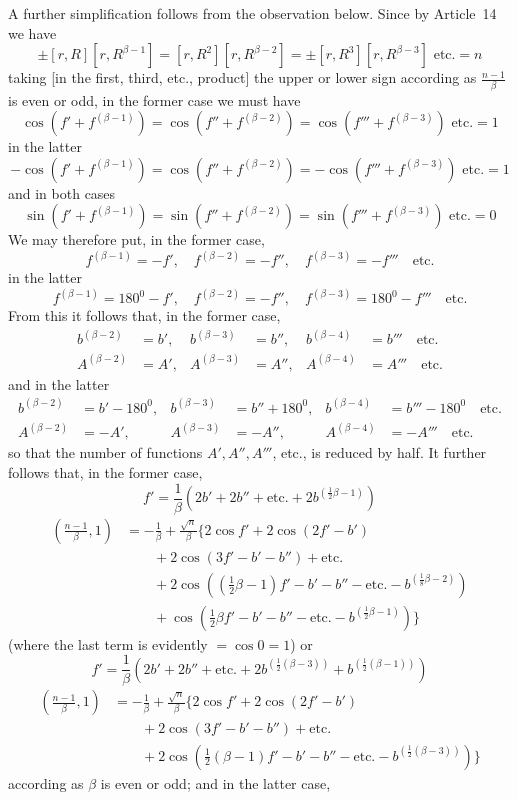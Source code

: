 \clearpage
{}
A further simplification follows from the observation below. Since by Article~14 we have
\[
\pm[r,R][r,R^{\beta-1}]=[r,R^2][r,R^{\beta-2}]=\pm[r,R^3][r,R^{\beta-3}]\text{ etc.}=n
\]
taking [in the first, third, etc., product] the upper or lower sign according as $\frac{n-1}\beta$ is even or odd, in the former case we must have
\[
\cos(f'+f^{(\beta-1)})=\cos(f''+f^{(\beta-2)})=\cos(f'''+f^{(\beta-3)})\text{ etc.}=1
\]
in the latter
\[
-\cos(f'+f^{(\beta-1)})=\cos(f''+f^{(\beta-2)})=-\cos(f'''+f^{(\beta-3)})\text{ etc.}=1
\]
and in both cases
\[
\sin(f'+f^{(\beta-1)})=\sin(f''+f^{(\beta-2)})=\sin(f'''+f^{(\beta-3)})\text{ etc.}=0
\]
We may therefore put, in the former case,
\[
f^{(\beta-1)}=-f',\quad f^{(\beta-2)}=-f'',\quad f^{(\beta-3)}=-f'''\quad\text{etc.}
\]
in the latter
\[
f^{(\beta-1)}=180^0-f',\quad f^{(\beta-2)}=-f'',\quad f^{(\beta-3)}=180^0-f'''\quad\text{etc.}
\]
From this it follows that, in the former case,
\[
\begin{aligned}
b^{(\beta-2)}&=b',&b^{(\beta-3)}&=b'',&b^{(\beta-4)}&=b'''\quad\text{etc.}\\
A^{(\beta-2)}&=A',&A^{(\beta-3)}&=A'',&A^{(\beta-4)}&=A'''\quad\text{etc.}
\end{aligned}
\]
and in the latter
\[
\begin{aligned}
b^{(\beta-2)}&=b'-180^0,&b^{(\beta-3)}&=b''+180^0,&b^{(\beta-4)}&=b'''-180^0\quad\text{etc.}\\
A^{(\beta-2)}&=-A',&A^{(\beta-3)}&=-A'',&A^{(\beta-4)}&=-A'''\quad\text{etc.}
\end{aligned}
\]
so that the number of functions $A',A'',A'''$, etc., is reduced by half. It further follows that, in the former case,
\begingroup{}
\[
f'=\frac1\beta(2b'+2b''+\text{etc.}+2b^{(\frac12\beta-1)})
\]
\endgroup
\begingroup{}
\[
\begin{aligned}
\left(\frac{n-1}\beta,1\right)&=-\frac1\beta+\frac{\surd n}\beta\{2\cos f'+2\cos(2f'-b')\\
&\qquad+2\cos(3f'-b'-b'')+\text{etc.}\\
&\qquad+2\cos((\tfrac12\beta-1)f'-b'-b''-\text{etc.}-b^{(\frac18\beta-2)})\\
&\qquad+\cos(\tfrac12\beta f'-b'-b''-\text{etc.}-b^{(\frac12\beta-1)})\}
\end{aligned}
\]
\endgroup
(where the last term is evidently $=\cos0=1$) or
\begingroup{}
\[
f'=\frac1\beta(2b'+2b''+\text{etc.}+2b^{(\frac12(\beta-3))}+b^{(\frac12(\beta-1))})
\]
\endgroup
\[
\begin{aligned}
\left(\frac{n-1}\beta,1\right)&=-\frac1\beta+\frac{\surd n}\beta\{2\cos f'+2\cos(2f'-b')\\
&\qquad+2\cos(3f'-b'-b'')+\text{etc.}\\
&\qquad+2\cos(\tfrac12(\beta-1)f'-b'-b''-\text{etc.}-b^{(\frac12(\beta-3))})\}
\end{aligned}
\]
according as $\beta$ is even or odd; and in the latter case,


